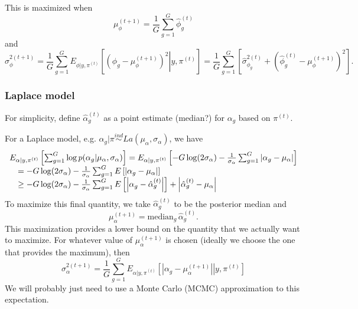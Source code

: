 \documentclass{article}
\begin{document}
This is maximized when 
\[ \mu_\phi^{(t+1)} = \frac{1}{G} \sum_{g=1}^G \hat{\phi}_{g}^{(t)} \]
and
\[ 
\sigma_\phi^{2(t+1)} 
= \frac{1}{G} \sum_{g=1}^G E_{\phi|y,\pi^{(t)}}\left[\left.\left(\phi_g-\mu_\phi^{(t+1)}\right)^2\right|y,\pi^{(t)}\right] 
= \frac{1}{G} \sum_{g=1}^G \left[ \hat{\sigma}_{\phi_g}^{2(t)} + \left(\hat{\phi}_{g}^{(t)}-\mu^{(t+1)}_\phi\right)^2 \right].
\] 



\subsubsection{Laplace model}

For simplicity, define $\hat{\alpha}_{g}^{(t)}$ as a point estimate (median?) for $\alpha_g$ based on $\pi^{(t)}$.

For a Laplace model, e.g. $\alpha_g|\pi \stackrel{ind}{\sim} La(\mu_\alpha,\sigma_\alpha)$, we have 
\[ 
\begin{array}{rl}
\multicolumn{2}{l}{
E_{\alpha|y,\pi^{(t)}} \left[ \sum_{g=1}^G \log p(\alpha_g|\mu_\alpha, \sigma_\alpha) \right] = 
E_{\alpha|y,\pi^{(t)}} \left[ -G\log(2\sigma_\alpha) - \frac{1}{\sigma_\alpha} \sum_{g=1}^G |\alpha_g-\mu_\alpha| \right]} \\
&= -G\log(2\sigma_\alpha) - \frac{1}{\sigma_\alpha} \sum_{g=1}^G E \left[|\alpha_g-\mu_\alpha| \right] \\
&\ge -G\log(2\sigma_\alpha) - \frac{1}{\sigma_\alpha} \sum_{g=1}^G E\left[\left|\alpha_g-\hat{\alpha}_{g}^{(t)}\right|\right] + \left|\hat{\alpha}_{g}^{(t)}-\mu_\alpha\right| \\
\end{array}
\]
To maximize this final quantity, we take $\hat{\alpha}_{g}^{(t)}$ to be the posterior median and 
\[ 
\mu_\alpha^{(t+1)} = \mbox{median}_g\, \hat{\alpha}_{g}^{(t)}.
\]
This maximization provides a lower bound on the quantity that we actually want to maximize. For whatever value of $\mu_\alpha^{(t+1)}$ is chosen (ideally we choose the one that provides the maximum), then 
\[
\sigma_\alpha^{2(t+1)} 
= \frac{1}{G} \sum_{g=1}^G E_{\alpha|y,\pi^{(t)}}\left[\left.\left|\alpha_g-\mu_\alpha^{(t+1)}\right|\right|y,\pi^{(t)}\right] 
\] 
We will probably just need to use a Monte Carlo (MCMC) approximation to this expectation. 
\end{document}
